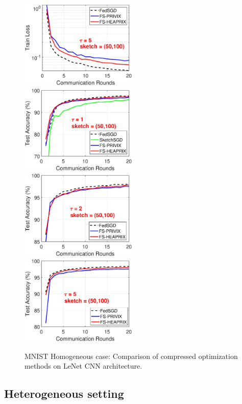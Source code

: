\documentclass[twoside]{article}
\begin{document}
\begin{figure}[H]
\begin{center}
{		\includegraphics[width=2.2in]{MNIST_figures/local5_sketch50_iid1_train_loss.eps}}
		\mbox{\hspace{-0.15in}	
		\includegraphics[width=2.2in]{MNIST_figures/local1_sketch50_iid1_test_acc.eps} \hspace{-0.15in}
		\includegraphics[width=2.2in]{MNIST_figures/local2_sketch50_iid1_test_acc.eps} \hspace{-0.15in}
		\includegraphics[width=2.2in]{MNIST_figures/local5_sketch50_iid1_test_acc.eps}
		}
	\end{center}
	\caption{MNIST Homogeneous case: Comparison of compressed optimization methods on LeNet CNN architecture.}
    \label{fig:MNIST-iid1-app}
\end{figure}

\subsection{Heterogeneous setting}
\end{document}
